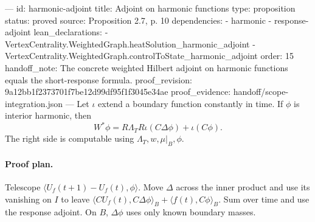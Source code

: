 ---
id: harmonic-adjoint
title: Adjoint on harmonic functions
type: proposition
status: proved
source: Proposition 2.7, p. 10
dependencies:
- harmonic
- response-adjoint
lean_declarations:
- VertexCentrality.WeightedGraph.heatSolution_harmonic_adjoint
- VertexCentrality.WeightedGraph.controlToState_harmonic_adjoint
order: 15
handoff_note: The concrete weighted Hilbert adjoint on harmonic functions equals the short-response formula.
proof_revision: 9a12bb1f2373701f7be12d99df95f1f3045e34ae
proof_evidence: handoff/scope-integration.json
---
Let $\iota$ extend a boundary function constantly in time. If $\phi$ is interior harmonic, then \[W^*\phi=R\Lambda_TR\iota(C\Delta\phi)+\iota(C\phi).\] The right side is computable using $\Lambda_T,w,\mu|_B,\phi$.

\paragraph{Proof plan.}
Telescope $\langle U_f(t+1)-U_f(t),\phi\rangle$. Move $\Delta$ across the inner product and use its vanishing on $I$ to leave $\langle CU_f(t),C\Delta\phi\rangle_B+\langle f(t),C\phi\rangle_B$. Sum over time and use the response adjoint. On $B$, $\Delta\phi$ uses only known boundary masses.
